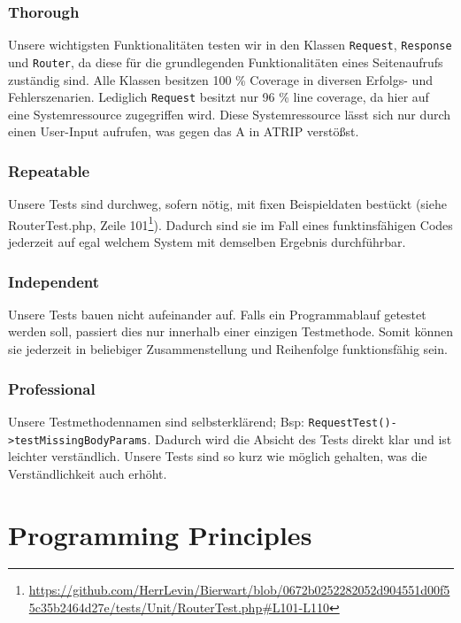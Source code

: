 \documentclass[12pt,a4paper,titlepage,ngerman,pdftex]{report}
\begin{document}
    \subsubsection{Thorough}
    Unsere wichtigsten Funktionalitäten testen wir in den Klassen \verb|Request|, \verb|Response| und \verb|Router|, da diese für die grundlegenden Funktionalitäten eines Seitenaufrufs zuständig sind.
    Alle Klassen besitzen 100 \% Coverage in diversen Erfolgs- und Fehlerszenarien. Lediglich \verb|Request| besitzt nur 96 \% line coverage, da hier auf eine Systemressource zugegriffen wird.
    Diese Systemressource lässt sich nur durch einen User-Input aufrufen, was gegen das A in ATRIP verstößst.

    \subsubsection{Repeatable}
    Unsere Tests sind durchweg, sofern nötig, mit fixen Beispieldaten bestückt (siehe RouterTest.php, Zeile 101\footnote{\url{https://github.com/HerrLevin/Bierwart/blob/0672b0252282052d904551d00f55c35b2464d27e/tests/Unit/RouterTest.php#L101-L110}}).
    Dadurch sind sie im Fall eines funktinsfähigen Codes jederzeit auf egal welchem System mit demselben Ergebnis durchführbar.

    \subsubsection{Independent}
    Unsere Tests bauen nicht aufeinander auf.
    Falls ein Programmablauf getestet werden soll, passiert dies nur innerhalb einer einzigen Testmethode.
    Somit können sie jederzeit in beliebiger Zusammenstellung und Reihenfolge funktionsfähig sein.

    \subsubsection{Professional}
    Unsere Testmethodennamen sind selbsterklärend; Bsp: \verb|RequestTest()->testMissingBodyParams|.
    Dadurch wird die Absicht des Tests direkt klar und ist leichter verständlich.
    Unsere Tests sind so kurz wie möglich gehalten, was die Verständlichkeit auch erhöht.

    \section{Programming Principles}
    \label{sec:programmingprinciples}
\end{document}
